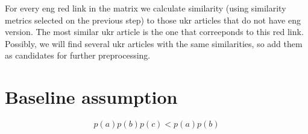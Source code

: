 \documentclass[11pt,a4paper]{article}
\begin{document}
For every eng red link in the matrix we calculate similarity (using similarity metrics selected on the previous step) to those ukr articles that do not have eng version. The most similar ukr article is the one that correeponds to this red link. Possibly, we will find several ukr articles with the same similarities, so add them as candidates for further preprocessing.

\section{Baseline assumption}

\[ p(a)p(b)p(c) < p(a)p(b) \]
\end{document}
